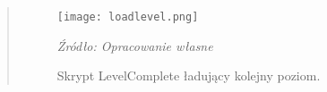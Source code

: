 \begin{quotation}
\begin{figure}[!h]
\centering
  \texttt{[image: loadlevel.png]}
  \caption{Skrypt LevelComplete ładujący kolejny poziom.}\label{rys_10}
  \begin{minipage}[t]{0.75\linewidth}
    \emph{Źródło: Opracowanie własne}
  \end{minipage}
\end{figure}

\end{quotation}
